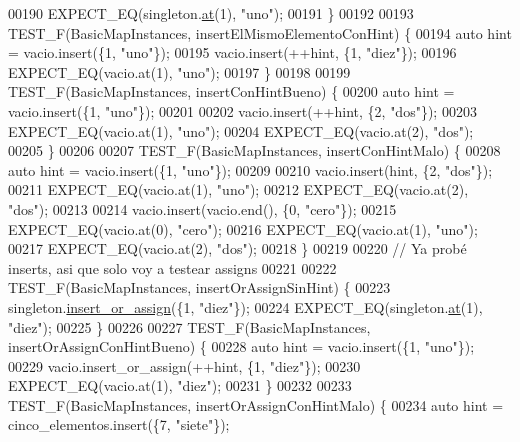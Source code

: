 \begin{DoxyCode}
00190     EXPECT\_EQ(singleton.\hyperlink{classaed2_1_1map_a579c9179b42175c23a1013ac7f1b876c_a579c9179b42175c23a1013ac7f1b876c}{at}(1), \textcolor{stringliteral}{"uno"});
00191 \}
00192 
00193 TEST\_F(BasicMapInstances, insertElMismoElementoConHint) \{
00194     \textcolor{keyword}{auto} hint = vacio.insert(\{1, \textcolor{stringliteral}{"uno"}\});
00195     vacio.insert(++hint, \{1, \textcolor{stringliteral}{"diez"}\});
00196     EXPECT\_EQ(vacio.at(1), \textcolor{stringliteral}{"uno"});
00197 \}
00198 
00199 TEST\_F(BasicMapInstances, insertConHintBueno) \{
00200     \textcolor{keyword}{auto} hint = vacio.insert(\{1, \textcolor{stringliteral}{"uno"}\});
00201 
00202     vacio.insert(++hint, \{2, \textcolor{stringliteral}{"dos"}\});
00203     EXPECT\_EQ(vacio.at(1), \textcolor{stringliteral}{"uno"});
00204     EXPECT\_EQ(vacio.at(2), \textcolor{stringliteral}{"dos"});
00205 \}
00206 
00207 TEST\_F(BasicMapInstances, insertConHintMalo) \{
00208     \textcolor{keyword}{auto} hint = vacio.insert(\{1, \textcolor{stringliteral}{"uno"}\});
00209 
00210     vacio.insert(hint, \{2, \textcolor{stringliteral}{"dos"}\});
00211     EXPECT\_EQ(vacio.at(1), \textcolor{stringliteral}{"uno"});
00212     EXPECT\_EQ(vacio.at(2), \textcolor{stringliteral}{"dos"});
00213 
00214     vacio.insert(vacio.end(), \{0, \textcolor{stringliteral}{"cero"}\});
00215     EXPECT\_EQ(vacio.at(0), \textcolor{stringliteral}{"cero"});
00216     EXPECT\_EQ(vacio.at(1), \textcolor{stringliteral}{"uno"});
00217     EXPECT\_EQ(vacio.at(2), \textcolor{stringliteral}{"dos"});
00218 \}
00219 
00220 \textcolor{comment}{// Ya probé inserts, asi que solo voy a testear assigns}
00221 
00222 TEST\_F(BasicMapInstances, insertOrAssignSinHint) \{
00223     singleton.\hyperlink{classaed2_1_1map_a2ef6723c183916276b0afc4a4c721475_a2ef6723c183916276b0afc4a4c721475}{insert\_or\_assign}(\{1, \textcolor{stringliteral}{"diez"}\});
00224     EXPECT\_EQ(singleton.\hyperlink{classaed2_1_1map_a579c9179b42175c23a1013ac7f1b876c_a579c9179b42175c23a1013ac7f1b876c}{at}(1), \textcolor{stringliteral}{"diez"});
00225 \}
00226 
00227 TEST\_F(BasicMapInstances, insertOrAssignConHintBueno) \{
00228     \textcolor{keyword}{auto} hint = vacio.insert(\{1, \textcolor{stringliteral}{"uno"}\});
00229     vacio.insert\_or\_assign(++hint, \{1, \textcolor{stringliteral}{"diez"}\});
00230     EXPECT\_EQ(vacio.at(1), \textcolor{stringliteral}{"diez"});
00231 \}
00232 
00233 TEST\_F(BasicMapInstances, insertOrAssignConHintMalo) \{
00234     \textcolor{keyword}{auto} hint = cinco\_elementos.insert(\{7, \textcolor{stringliteral}{"siete"}\});

\end{DoxyCode}
